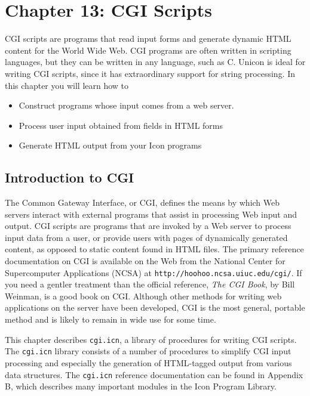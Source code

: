 \clearpage\section{Chapter 13: CGI Scripts}

CGI scripts are programs that read input forms and generate
dynamic HTML content for the World Wide
Web. CGI programs are often written in scripting
languages, but they can be written in any language, such as C.
Unicon is ideal for writing CGI scripts, since it
has extraordinary support for string processing. In this chapter you
will learn how to

\begin{itemize}\itemsep0pt
\item Construct programs whose input comes from a web server.
\item Process user input obtained from fields in HTML forms
\item Generate HTML output from your Icon programs
\end{itemize}

\subsection{Introduction to CGI}

The Common Gateway Interface, or CGI, defines the means by which Web
servers interact with external programs that assist in processing Web
input and output. CGI scripts are programs that are invoked by a Web
server to process input data from a user, or provide users with pages
of dynamically generated content, as opposed to static content found in
HTML files. The primary
reference documentation on CGI is
available on the Web from the National Center for Supercomputer
Applications (NCSA) at \texttt{http://hoohoo.ncsa.uiuc.edu/cgi/}. If
you need a gentler treatment than the official reference, \textit{The
CGI Book}, by Bill Weinman, is a good book on CGI. Although other
methods for writing web applications on the server have been developed,
CGI is the most general, portable method and is likely to remain in
wide use for some time.

This chapter describes \texttt{cgi.icn}, a library of procedures for
writing CGI scripts. The \texttt{cgi.icn} library consists of a number
of procedures to simplify CGI input processing and especially the
generation of HTML-tagged output from various data structures. The
\texttt{cgi.icn} reference documentation can be found in Appendix B,
which describes many important modules in the Icon Program Library.

